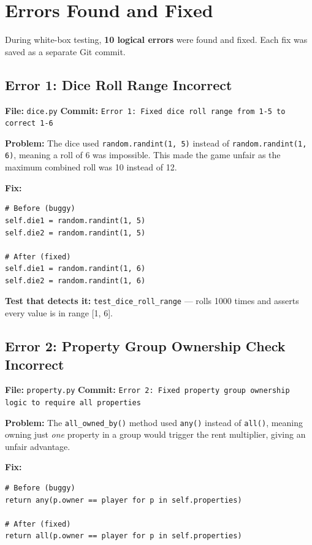 \documentclass[12pt,a4paper]{article}
\begin{document}
\newpage
\section{Errors Found and Fixed}

During white-box testing, \textbf{10 logical errors} were found and fixed. Each fix was saved as a separate Git commit.

\subsection{Error 1: Dice Roll Range Incorrect}
\textbf{File:} \texttt{dice.py} \quad \textbf{Commit:} \texttt{Error 1: Fixed dice roll range from 1-5 to correct 1-6}

\textbf{Problem:} The dice used \texttt{random.randint(1, 5)} instead of \texttt{random.randint(1, 6)}, meaning a roll of 6 was impossible. This made the game unfair as the maximum combined roll was 10 instead of 12.

\textbf{Fix:}
\begin{lstlisting}
# Before (buggy)
self.die1 = random.randint(1, 5)
self.die2 = random.randint(1, 5)

# After (fixed)
self.die1 = random.randint(1, 6)
self.die2 = random.randint(1, 6)
\end{lstlisting}

\textbf{Test that detects it:} \texttt{test\_dice\_roll\_range} --- rolls 1000 times and asserts every value is in range [1, 6].


\subsection{Error 2: Property Group Ownership Check Incorrect}
\textbf{File:} \texttt{property.py} \quad \textbf{Commit:} \texttt{Error 2: Fixed property group ownership logic to require all properties}

\textbf{Problem:} The \texttt{all\_owned\_by()} method used \texttt{any()} instead of \texttt{all()}, meaning owning just \textit{one} property in a group would trigger the rent multiplier, giving an unfair advantage.

\textbf{Fix:}
\begin{lstlisting}
# Before (buggy)
return any(p.owner == player for p in self.properties)

# After (fixed)
return all(p.owner == player for p in self.properties)
\end{lstlisting}
\end{document}
